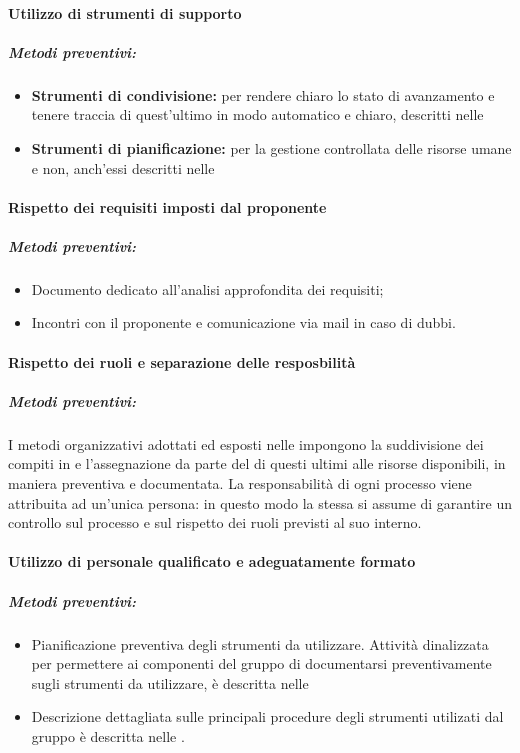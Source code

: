 \documentclass[12pt,a4paper]{article}
\begin{document}
\paragraph{Utilizzo di strumenti di supporto}
\subparagraph{Metodi preventivi:}
\begin{itemize}
	\item \textbf{Strumenti di condivisione:} per rendere chiaro lo stato di avanzamento e tenere traccia di quest'ultimo in modo automatico e chiaro, descritti nelle \NdP{}
	\item \textbf{Strumenti di pianificazione:} per la gestione controllata delle risorse umane e non, anch'essi descritti nelle \NdP{}
\end{itemize}

\paragraph{Rispetto dei requisiti imposti dal proponente \Zucchetti{}}
\subparagraph{Metodi preventivi:}
\begin{itemize}
	\item Documento dedicato all'analisi approfondita dei requisiti;
	\item Incontri con il proponente e comunicazione via mail in caso di dubbi.
\end{itemize}

\paragraph{Rispetto dei ruoli e separazione delle resposbilità}
\subparagraph{Metodi preventivi:}
I metodi organizzativi adottati ed esposti nelle \NdP{} impongono la suddivisione dei compiti in  e l'assegnazione da parte del \PM{} di questi ultimi alle risorse disponibili, in maniera preventiva e documentata. 
La responsabilità di ogni processo viene attribuita ad un'unica persona: in questo modo la stessa si assume di garantire un controllo sul processo e sul rispetto dei ruoli previsti al suo interno.

\paragraph{Utilizzo di personale qualificato e adeguatamente formato}
\subparagraph{Metodi preventivi:}
\begin{itemize}
	\item Pianificazione preventiva degli strumenti da utilizzare. Attività dinalizzata per permettere ai componenti del gruppo di documentarsi preventivamente sugli strumenti da utilizzare, è descritta nelle \NdP{}
	\item Descrizione dettagliata sulle principali procedure degli strumenti utilizati dal gruppo è descritta nelle \NdP{}.
\end{itemize}
\end{document}
